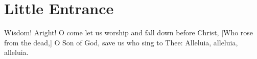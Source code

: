 \section{Little Entrance}

\begin{liturgicaltext}
    \deacon Wisdom! Aright!
    \choir O come let us worship and fall down before Christ, [Who rose from the dead,] O Son of God, save us who sing to Thee: Alleluia, alleluia, alleluia.
\end{liturgicaltext}